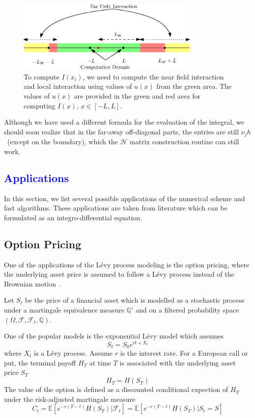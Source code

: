 \documentclass[3p,,preprint,12pt]{elsarticle}
\newcommand{\lib}[1]{\textcolor{blue}{\section{#1}}}
\theoremstyle{definition}
\begin{document}
\begin{figure}[H] %
\centering
\includegraphics[width=0.8\textwidth,keepaspectratio]{figures/fig31}
\caption{To compute $I(x_i)$, we need to compute the near field interaction and local interaction using values of $u(x)$ from the green area. The values of $u(x)$ are provided in the green and red area for computing $I(x)$, $x\in [-L, L]$.}
\label{fig:fig31}
\end{figure}


Although we have used a different formula for the evaluation of the integral, we should soon realize that in the far-away off-diagonal parts, the entries are still $\nu_j h$~(except on the boundary), which the $\mathcal{H}$ matrix construction routine can still work. 

\lib{Applications}

In this section, we list several possible applications of the numerical scheme and fast algorithms. These applications are taken from literature which can be formulated as an integro-differential equation.

\subsection{Option Pricing}

One of the applications of the L\'evy process modeling is the option pricing, where the underlying asset price is assumed to follow a L\'evy process instead of the Brownian motion~\cite{tankov2009jump,kou2002jump}.

Let $S_t$ be the price of a financial asset which is modelled as a stochastic process under a martingale equivalence measure $\mathbb{Q}'$ and on a filtered probability space $(\Omega, \mathcal{F}, \mathcal{F}_t, \mathbb{Q})$.

One of the popular models is the exponential L\'evy model which assumes
\begin{equation}
	S_t = S_0 e^{rt+X_t}
\end{equation}
where $X_t$ is a L\'evy process. Assume $r$ is the interest rate. For a European call or put, the terminal payoff $H_T$ at time $T$ is associated with the underlying asset price $S_T$
\begin{equation}
	H_T = H(S_T)
\end{equation}
 The value of the option is defined as a discounted conditional expection of $H_T$ under the risk-adjusted martingale measure
\begin{equation}
	C_t = \mathbb{E}[e^{-r(T-t)}H(S_T)|\mathcal{F}_t] = \mathbb{E}[e^{-r(T-t)}H(S_T)|S_t=S]
\end{equation}
\end{document}
